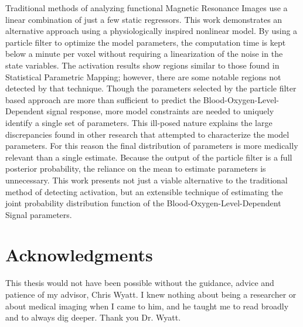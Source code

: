\documentclass[12pt]{report}
\numberwithin{algorithm}{chapter}
\begin{document}
Traditional methods of analyzing functional Magnetic Resonance 
Images use a linear combination of
just a few static regressors. This work demonstrates an alternative
approach using a physiologically inspired nonlinear model. By using a 
particle filter to optimize the model parameters, the computation time
is kept below a minute per voxel without requiring a linearization 
of the noise in the state
variables. The activation results show regions similar to those found in 
Statistical Parametric Mapping; however, there are some notable regions not 
detected by that technique. Though the parameters selected by the particle filter based approach
are more than sufficient to predict the Blood-Oxygen-Level-Dependent signal
response,
more model constraints are needed to uniquely identify a single set
of parameters. This ill-posed nature explains the large discrepancies
found in other research that attempted to characterize the model parameters.
For this reason the final distribution of parameters is more medically relevant
than a single estimate. Because the output of the particle filter is 
a full posterior probability, the reliance on the mean to estimate 
parameters is unnecessary. This work presents
not just a viable alternative to the traditional method of detecting
activation, but an extensible technique of estimating the joint probability
distribution function of the Blood-Oxygen-Level-Dependent Signal parameters.

\vfill



\pagebreak

\chapter*{Acknowledgments}

This thesis would not have been possible without the guidance, advice and
patience of my advisor, Chris Wyatt. I knew nothing about being a researcher
or about medical imaging when I came to him, and he taught me to read broadly
and to always dig deeper. Thank you Dr. Wyatt.
\end{document}
